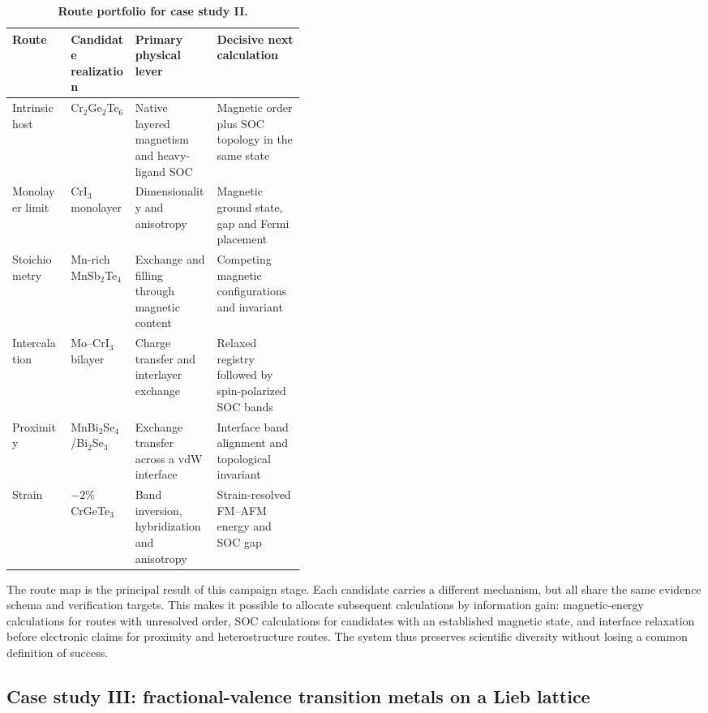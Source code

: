 \begin{table}[t]
    \centering
    \caption{\textbf{Route portfolio for case study II.}}
    \label{tab:vdw-routes}
    \small
    \setlength{\tabcolsep}{3.5pt}
    \renewcommand{\arraystretch}{1.12}
    \begin{tabularx}{\linewidth}{>{\raggedright\arraybackslash}p{0.20\linewidth}>{\raggedright\arraybackslash}p{0.22\linewidth}XX}
        \toprule
        \textbf{Route} & \textbf{Candidate realization} & \textbf{Primary physical lever} & \textbf{Decisive next calculation} \\
        \midrule
        Intrinsic host & Cr$_2$Ge$_2$Te$_6$ & Native layered magnetism and heavy-ligand SOC & Magnetic order plus SOC topology in the same state \\
        Monolayer limit & CrI$_3$ monolayer & Dimensionality and anisotropy & Magnetic ground state, gap and Fermi placement \\
        Stoichiometry & Mn-rich MnSb$_2$Te$_4$ & Exchange and filling through magnetic content & Competing magnetic configurations and invariant \\
        Intercalation & Mo--CrI$_3$ bilayer & Charge transfer and interlayer exchange & Relaxed registry followed by spin-polarized SOC bands \\
        Proximity & MnBi$_2$Se$_4$/Bi$_2$Se$_3$ & Exchange transfer across a vdW interface & Interface band alignment and topological invariant \\
        Strain & $-2\%$ CrGeTe$_3$ & Band inversion, hybridization and anisotropy & Strain-resolved FM--AFM energy and SOC gap \\
        \bottomrule
    \end{tabularx}
\end{table}

The route map is the principal result of this campaign stage.  Each candidate carries a different mechanism, but all share the same evidence schema and verification targets.  This makes it possible to allocate subsequent calculations by information gain: magnetic-energy calculations for routes with unresolved order, SOC calculations for candidates with an established magnetic state, and interface relaxation before electronic claims for proximity and heterostructure routes.  The system thus preserves scientific diversity without losing a common definition of success.

\subsection{Case study III: fractional-valence transition metals on a Lieb lattice}
\label{sec:case-lieb}

